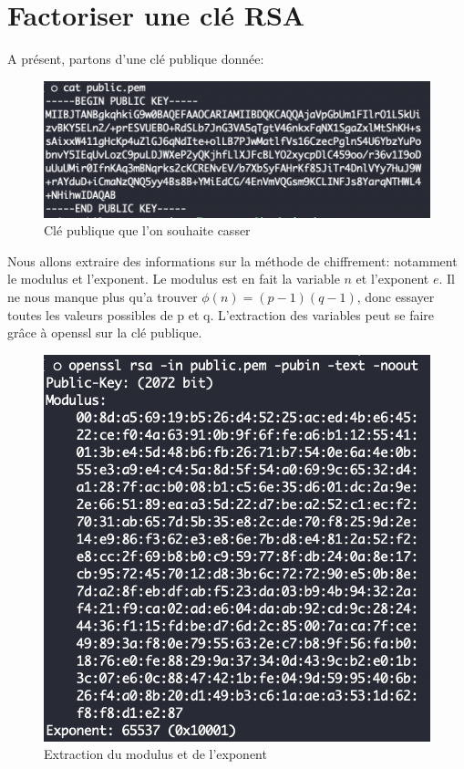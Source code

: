 \documentclass[12pt, oneside]{article}
\begin{document}
\section{Factoriser une clé RSA}
A présent, partons d'une clé publique donnée:

\begin{figure}[ht]
\centering
\includegraphics[scale=0.6]{publickey}
\caption{Clé publique que l'on souhaite casser}
\end{figure}
Nous allons extraire des informations sur la méthode de chiffrement: notamment le modulus et l'exponent. Le modulus est en fait la variable \(n\) et l'exponent \(e\).
Il ne nous manque plus qu'a trouver \(\phi(n) = (p - 1)(q - 1)\), donc essayer toutes les valeurs possibles de p et q. L'extraction des variables peut se faire grâce à openssl sur la clé publique. 
\begin{figure}[ht]
\centering
\includegraphics[scale=0.6]{modulus}
\caption{Extraction du modulus et de l'exponent}
\end{figure}
\end{document}
